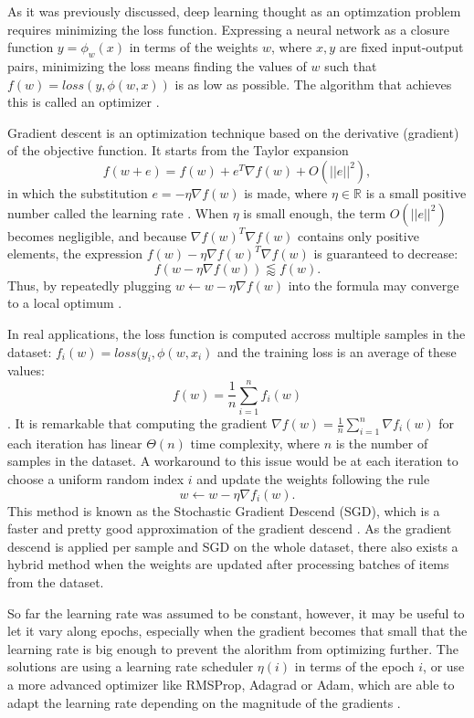 As it was previously discussed, deep learning thought as an optimzation problem requires minimizing the loss function. Expressing a neural network as a closure function  $y=\phi_w(x)$ in terms of the weights $w$, where $x, y$ are fixed input-output pairs, minimizing the loss means finding the values of $w$ such that $f(w) = loss(y, \phi(w,x))$ is as low as possible. The algorithm that achieves this is called an optimizer \cite{D2l}.

Gradient descent is an optimization technique based on the derivative (gradient) of the objective function. It starts from the Taylor expansion
$$f(w+e) = f(w) + e^T \nabla f(w) + O(||e||^2),$$
in which the substitution $e=-\eta \nabla f(w)$ is made, where $\eta\in\mathbb{R}$ is a small positive number called the learning rate \cite{D2l}. When $\eta$ is small enough, the term $O(||e||^2)$ becomes negligible, and because $\nabla f(w)^T \nabla f(w)$ contains only positive elements, the expression $ f(w) - \eta \nabla f(w)^T \nabla f(w)$ is guaranteed to decrease: 
$$ f(w-\eta\nabla f(w)) \lessapprox f(w). $$ 
Thus, by repeatedly plugging $w\leftarrow w-\eta \nabla f(w)$ into the formula may converge to a local optimum \cite{D2l}.

In real applications, the loss function is computed accross multiple samples in the dataset: $f_i(w)=loss(y_i, \phi(w, x_i)$ and the training loss is an average of these values: 
$$f(w)=\frac{1}{n}\sum_{i=1}^{n} f_i(w)$$. 
It is remarkable that computing the gradient $\nabla f(w)=\frac{1}{n}\sum_{i=1}^{n} \nabla f_i(w)$ for each iteration has linear $\Theta(n)$ time complexity, where $n$ is the number of samples in the dataset. A workaround to this issue would be at each iteration to choose a uniform random index $i$ and update the weights following the rule 
$$w\leftarrow w-\eta \nabla f_i(w).$$
This method is known as the Stochastic Gradient Descend (SGD), which is a faster and pretty good approximation of the gradient descend  \cite{D2l}. As the gradient descend is applied per sample and SGD on the whole dataset, there also exists a hybrid method when the weights are updated after processing batches of items from the dataset. 

So far the learning rate was assumed to be constant, however, it may be useful to let it vary along epochs, especially when the gradient becomes that small that the learning rate is big enough to prevent the alorithm from optimizing further. The solutions are using a learning rate scheduler $\eta(i)$ in terms of the epoch $i$, or use a more advanced optimizer like RMSProp, Adagrad or Adam, which are able to adapt the learning rate depending on the magnitude of the gradients \cite{D2l}. 

